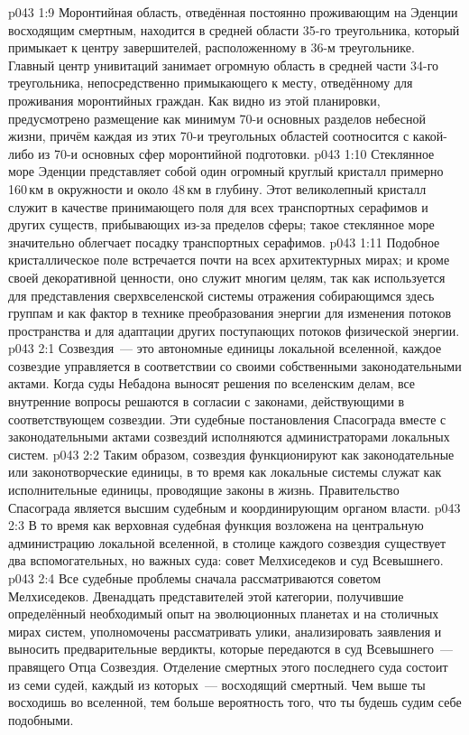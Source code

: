 \vs p043 1:9 Моронтийная область, отведённая постоянно проживающим на Эденции восходящим смертным, находится в средней области 35-го треугольника, который примыкает к центру завершителей, расположенному в 36-м треугольнике. Главный центр унивитаций занимает огромную область в средней части 34-го треугольника, непосредственно примыкающего к месту, отведённому для проживания моронтийных граждан. Как видно из этой планировки, предусмотрено размещение как минимум 70-и основных разделов небесной жизни, причём каждая из этих 70-и треугольных областей соотносится с какой\hyp{}либо из 70-и основных сфер моронтийной подготовки.
\vs p043 1:10 Стеклянное море Эденции представляет собой один огромный круглый кристалл примерно 160\,км в окружности и около 48\,км в глубину. Этот великолепный кристалл служит в качестве принимающего поля для всех транспортных серафимов и других существ, прибывающих из-за пределов сферы; такое стеклянное море значительно облегчает посадку транспортных серафимов.
\vs p043 1:11 Подобное кристаллическое поле встречается почти на всех архитектурных мирах; и кроме своей декоративной ценности, оно служит многим целям, так как используется для представления сверхвселенской системы отражения собирающимся здесь группам и как фактор в технике преобразования энергии для изменения потоков пространства и для адаптации других поступающих потоков физической энергии.
\vs p043 2:1 Созвездия~--- это автономные единицы локальной вселенной, каждое созвездие управляется в соответствии со своими собственными законодательными актами. Когда суды Небадона выносят решения по вселенским делам, все внутренние вопросы решаются в согласии с законами, действующими в соответствующем созвездии. Эти судебные постановления Спасограда вместе с законодательными актами созвездий исполняются администраторами локальных систем.
\vs p043 2:2 Таким образом, созвездия функционируют как законодательные или законотворческие единицы, в то время как локальные системы служат как исполнительные единицы, проводящие законы в жизнь. Правительство Спасограда является высшим судебным и координирующим органом власти.
\vs p043 2:3 \pc В то время как верховная судебная функция возложена на центральную администрацию локальной вселенной, в столице каждого созвездия существует два вспомогательных, но важных суда: совет Мелхиседеков и суд Всевышнего.
\vs p043 2:4 Все судебные проблемы сначала рассматриваются советом Мелхиседеков. Двенадцать представителей этой категории, получившие определённый необходимый опыт на эволюционных планетах и на столичных мирах систем, уполномочены рассматривать улики, анализировать заявления и выносить предварительные вердикты, которые передаются в суд Всевышнего~--- правящего Отца Созвездия. Отделение смертных этого последнего суда состоит из семи судей, каждый из которых~--- восходящий смертный. Чем выше ты восходишь во вселенной, тем больше вероятность того, что ты будешь судим себе подобными.
